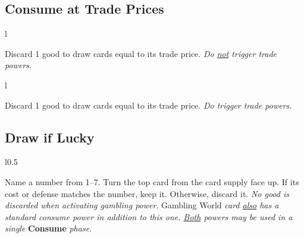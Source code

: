 \documentclass[letterpaper,landscape,twocolumn,8pt]{extarticle}
\begin{document}
\begin{minipage}[t]{\calc{1/3}\columnwidth}
\setlength{\intextsep}{0pt}%


\subsection*{\RaggedRight{}Consume at Trade Prices}
\begin{wrapfigure}{l}{\columnwidth}
    
\end{wrapfigure}

Discard 1 good to draw cards equal to its trade price.
\smallbreak{}
\textit{Do \underline{not} trigger trade powers}.


\begin{wrapfigure}{l}{\columnwidth}
    
\end{wrapfigure}


Discard 1 good to draw cards equal to its trade price.
\smallbreak{}
\textit{Do trigger trade powers}.

\subsection*{\RaggedRight{}Draw if Lucky}
\begin{wrapfigure}{l}{0.5\columnwidth}
    
\end{wrapfigure}

Name a number from 1--7. Turn the top card from the card supply face up. If
its cost or defense matches the number, keep it. Otherwise, discard it.
\smallbreak{}
\textit{No good is discarded when activating gambling power}.
\smallbreak{}
Gambling World
\textit{card \underline{also} has a standard consume power in addition to this
    one. \underline{Both}
powers may be used in a single} \textbf{Consume} \textit{phase.}





\end{minipage}
\end{document}
